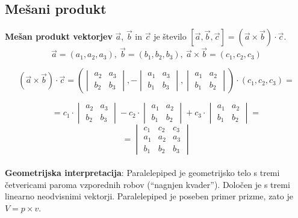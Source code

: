 \documentclass[a4paper,12pt]{article}
\begin{document}
\newpage

\begin{center}
\subsection{Mešani produkt}
\end{center}

\textbf{Mešan produkt vektorjev} $\vec{a}$, $\vec{b}$ in $\vec{c}$ je število $[\vec{a},\vec{b},\vec{c}] = (\vec{a} \times \vec{b}) \cdot \vec{c}$. \\

$$ \vec{a} = (a_1, a_2, a_3),~ \vec{b} = (b_1, b_2, b_3),~ \vec{a} \times \vec{b} = (c_1, c_2, c_3)$$

$$
(\vec{a} \times \vec{b}) \cdot \vec{c}= (
\begin{vmatrix}
a_2 & a_3 \\
b_2 & b_3
\end{vmatrix}
,-
\begin{vmatrix}
a_1 & a_3 \\
b_1 & b_3
\end{vmatrix}
,
\begin{vmatrix}
a_1 & a_2 \\
b_1 & b_2 
\end{vmatrix}
) \cdot (c_1, c_2, c_3) = $$

$$ = c_1 \cdot
\begin{vmatrix}
a_2 & a_3 \\
b_2 & b_3
\end{vmatrix}
- c_2 \cdot
\begin{vmatrix}
a_1 & a_2 \\
b_1 & b_2
\end{vmatrix}
+ c_3 \cdot
\begin{vmatrix}
a_1 & a_2 \\
b_1 & b_2
\end{vmatrix}
= $$
$$ =
\begin{vmatrix}
c_1 & c_2 & c_3 \\
a_1 & a_2 & a_3 \\
b_1 & b_2 & b_3
\end{vmatrix} 
$$ \\

\textbf{Geometrijska interpretacija}: Paralelepiped je geometrijsko telo s tremi četvericami paroma vzporednih robov (``nagnjen kvader''). Določen je s tremi linearno neodvisnimi vektorji. Paralelepiped je poseben primer prizme, zato je $ V = p \times v $. \\
\end{document}
